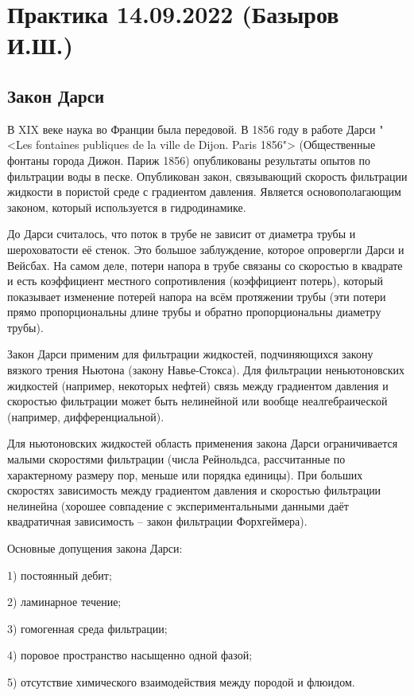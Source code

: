 \documentclass[main.tex]{subfiles}
\begin{document}
\section{Практика 14.09.2022 (Базыров И.Ш.)}

\subsection{Закон Дарси}

В XIX веке наука во Франции была передовой.
В 1856 году в работе Дарси "<Les fontaines publiques de la ville de Dijon. Paris 1856"> (Общественные фонтаны города Дижон. Париж 1856) опубликованы результаты опытов по фильтрации воды в песке.
Опубликован закон, связывающий скорость фильтрации жидкости в пористой среде с градиентом давления.
Является основополагающим законом, который используется в гидродинамике.

До Дарси считалось, что поток в трубе не зависит от диаметра трубы и шероховатости её стенок. Это большое заблуждение, которое опровергли Дарси и Вейсбах.
На самом деле, потери напора в трубе связаны со скоростью в квадрате и есть коэффициент местного сопротивления (коэффициент потерь), который показывает изменение потерей напора на всём протяжении трубы (эти потери прямо пропорциональны длине трубы и обратно пропорциональны диаметру трубы).

Закон Дарси применим для фильтрации жидкостей, подчиняющихся закону вязкого трения Ньютона (закону Навье-Стокса).
Для фильтрации неньютоновских жидкостей (например, некоторых нефтей) связь между градиентом давления и скоростью фильтрации может быть нелинейной или вообще неалгебраической (например, дифференциальной).

Для ньютоновских жидкостей область применения закона Дарси ограничивается малыми скоростями фильтрации (числа Рейнольдса, рассчитанные по характерному размеру пор, меньше или порядка единицы).
При больших скоростях зависимость между градиентом давления и скоростью фильтрации нелинейна (хорошее совпадение с экспериментальными данными даёт квадратичная зависимость -- закон фильтрации Форхгеймера).

Основные допущения закона Дарси:

1) постоянный дебит;

2) ламинарное течение;

3) гомогенная среда фильтрации;

4) поровое пространство насыщенно одной фазой;

5) отсутствие химического взаимодействия между породой и флюидом.
\end{document}
